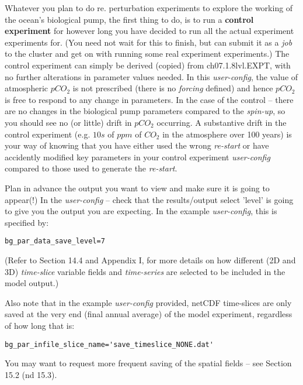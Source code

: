 Whatever you plan to do re. perturbation experiments to explore the working of the ocean's biological pump, the first thing to do, is to run a \textbf{control experiment} for however long you have decided to run all the actual experiment experiments for. (You need not wait for this to finish, but can submit it as a \textit{job} to the cluster and get on with running some real experiment experiments.) The control experiment can simply be derived (copied) from \textsf{\footnotesize ch07.1.8lvl.EXPT}, with no further alterations in parameter values needed. In this \textit{user-config}, the value of atmospheric  \(pCO_{2}\) is not prescribed (there is no \textit{forcing} defined) and hence \(pCO_{2}\) is free to respond to any change in parameters. In the case of the control -- there are no changes in the biological pump parameters compared to the \textit{spin-up}, so you should see no (or little) drift in \(pCO_{2}\) occurring. 
A substantive drift in the control experiment (e.g. \(10s\) of \(ppm\) of \(CO_{2}\) in the atmosphere over 100 years) is your way of knowing that you have either used the wrong \textit{re-start} or have accidently modified key parameters in your control experiment \textit{user-config} compared to those used to generate the \textit{re-start}.

\vspace{1mm}
Plan in advance  the output you want to view and make sure it is going to appear(!) In the \textit{user-config} -- check that the results/output select 'level' is going to give you the output you are expecting. In the example \textit{user-config}, this is specified by:
\vspace{-1mm}\small\begin{verbatim}
bg_par_data_save_level=7
\end{verbatim}\normalsize\vspace{-1mm}
(Refer to Section 14.4 and Appendix I, for more details on how different (2D and 3D) \textit{time-slice} variable fields and \textit{time-series} are selected to be included in the model output.)

\vspace{1mm}
Also note that in the example \textit{user-config} provided, netCDF time-slices are only saved at the very end (final annual average) of the model experiment, regardless of how long that is:
\vspace{-1mm}\small\begin{verbatim}
bg_par_infile_slice_name='save_timeslice_NONE.dat'
\end{verbatim}\normalsize\vspace{-1mm}
You may want to request more frequent saving of the spatial fields -- see Section 15.2 (nd 15.3).

